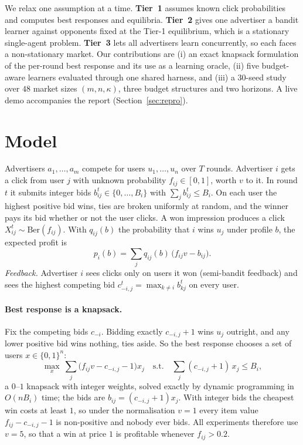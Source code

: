 \documentclass[11pt]{article}
\begin{document}
We relax one assumption at a time. \textbf{Tier~1} assumes known click probabilities and computes
best responses and equilibria. \textbf{Tier~2} gives one advertiser a bandit learner against opponents
fixed at the Tier-1 equilibrium, which is a stationary single-agent problem. \textbf{Tier~3} lets all
advertisers learn concurrently, so each faces a non-stationary market. Our contributions are
(i) an exact knapsack formulation of the per-round best response and its use as a learning oracle,
(ii) five budget-aware learners evaluated through one shared harness, and (iii) a $30$-seed study over
$48$ market sizes $(m,n,\kappa)$, three budget structures and two horizons. A live demo accompanies the
report (Section~\ref{sec:repro}).

\section{Model}\label{sec:model}
Advertisers $a_1,\dots,a_m$ compete for users $u_1,\dots,u_n$ over $T$ rounds. Advertiser $i$ gets a
click from user $j$ with unknown probability $f_{ij}\in[0,1]$, worth $v$ to it. In round $t$ it submits
integer bids $b^t_{ij}\in\{0,\dots,B_i\}$ with $\sum_j b^t_{ij}\le B_i$. On each user the highest
positive bid wins, ties are broken uniformly at random, and the winner pays its bid whether or not the
user clicks. A won impression produces a click $X^t_{ij}\sim\mathrm{Ber}(f_{ij})$. With $q_{ij}(b)$ the
probability that $i$ wins $u_j$ under profile $b$, the expected profit is
\begin{equation}
  p_i(b)=\textstyle\sum_{j} q_{ij}(b)\,\big(f_{ij}v-b_{ij}\big).
\end{equation}
\emph{Feedback.} Advertiser $i$ sees clicks only on users it won (semi-bandit feedback) and sees the
highest competing bid $c^t_{-i,j}=\max_{k\ne i} b^t_{kj}$ on every user.

\paragraph{Best response is a knapsack.} Fix the competing bids $c_{-i}$. Bidding exactly
$c_{-i,j}+1$ wins $u_j$ outright, and any lower positive bid wins nothing, ties aside. So the best
response chooses a set of users $x\in\{0,1\}^n$:
\begin{equation}\label{eq:knap}
  \max_{x}\ \sum_j \big(f_{ij}v-c_{-i,j}-1\big)x_j
  \quad\text{s.t.}\quad \sum_j (c_{-i,j}+1)\,x_j\le B_i ,
\end{equation}
a $0$--$1$ knapsack with integer weights, solved exactly by dynamic programming in $O(nB_i)$ time; the
bids are $b_{ij}=(c_{-i,j}+1)x_j$. With integer bids the cheapest win costs at least $1$, so under the
normalisation $v=1$ every item value $f_{ij}-c_{-i,j}-1$ is non-positive and nobody ever bids. All
experiments therefore use $v=5$, so that a win at price $1$ is profitable whenever $f_{ij}>0.2$.
\end{document}
